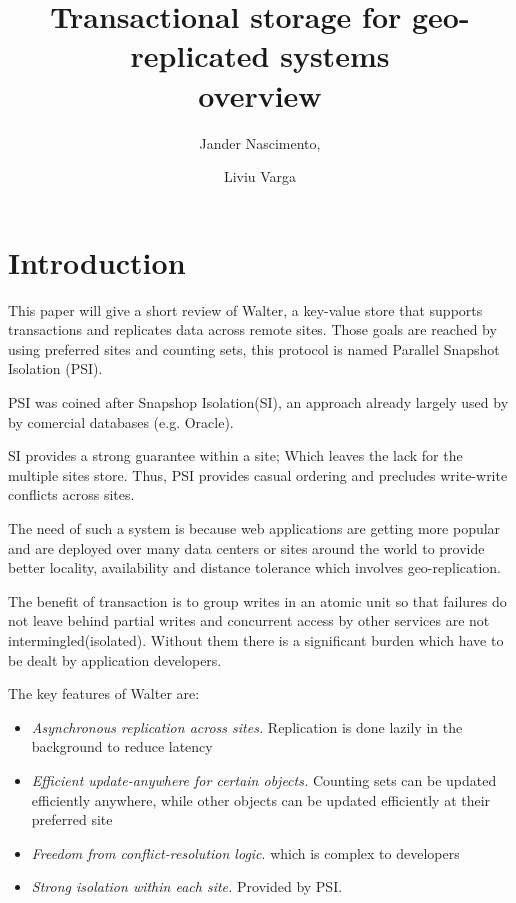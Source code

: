\documentclass[a4paper]{article}
\begin{document}
\title{Transactional storage for geo-replicated systems \\ overview}

\author{Jander Nascimento,
\and Liviu Varga}

\maketitle


\section{Introduction}
This paper will give a short review of Walter, a key-value store that supports transactions and replicates data across remote sites. Those goals are reached by using preferred sites and counting sets, this protocol is named Parallel Snapshot Isolation (PSI). 

PSI was coined after Snapshop Isolation(SI), an approach already largely used by by comercial databases (e.g. Oracle). 

SI provides a strong guarantee within a site; Which leaves the lack for the multiple sites store. Thus, PSI provides casual ordering and precludes write-write conflicts across sites.

The need of such a system is because web applications are getting more popular and are deployed over many data centers or sites around the world to provide better locality, availability and distance tolerance which involves geo-replication. 

The benefit of transaction is to group writes in an atomic unit so that failures do not leave behind partial writes and concurrent access by other services are not intermingled(isolated). Without them there is a significant burden which have to be dealt by application developers. 

The key features of Walter are:

\begin{itemize}
\item \textit{Asynchronous replication across sites.} Replication is done lazily in the background to reduce latency
\item \textit{Efficient update-anywhere for certain objects.} Counting sets can be updated efficiently anywhere, while other objects can be updated efficiently at their preferred site
\item \textit{Freedom from conflict-resolution logic}. which is complex to developers
\item \textit{Strong isolation within each site.} Provided by PSI.
\end{itemize}
          
\end{document}
